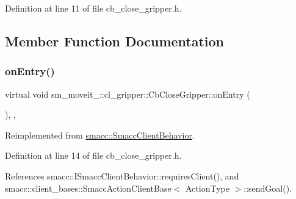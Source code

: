 Definition at line 11 of file cb\+\_\+close\+\_\+gripper.\+h.



\subsection{Member Function Documentation}
\mbox{\label{classsm__moveit__3_1_1cl__gripper_1_1CbCloseGripper_afb060027abdf32de5c2d0e400c257228}} 
\subsubsection{\texorpdfstring{on\+Entry()}{onEntry()}}
{\footnotesize\ttfamily virtual void sm\+\_\+moveit\+\_\+::cl\+\_\+gripper\+::\+Cb\+Close\+Gripper\+::on\+Entry (\begin{DoxyParamCaption}{ }\end{DoxyParamCaption})\hspace{0.3cm}{\ttfamily [inline]}, {\ttfamily [override]}, {\ttfamily [virtual]}}



Reimplemented from \hyperlink{classsmacc_1_1SmaccClientBehavior_ad5d3e1f1697c3cfe66c94cadba948493}{smacc\+::\+Smacc\+Client\+Behavior}.



Definition at line 14 of file cb\+\_\+close\+\_\+gripper.\+h.



References smacc\+::\+I\+Smacc\+Client\+Behavior\+::requires\+Client(), and smacc\+::client\+\_\+bases\+::\+Smacc\+Action\+Client\+Base$<$ Action\+Type $>$\+::send\+Goal().


